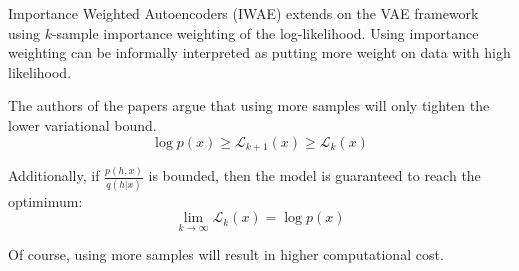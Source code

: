

Importance Weighted Autoencoders (IWAE) extends on the VAE framework using $k$-sample importance weighting of the log-likelihood.
Using importance weighting can be informally interpreted as putting more weight on data with high likelihood.

The authors of the papers argue that using more samples will only tighten the lower variational bound.
$$
\log p(x) \geq \mathcal{L}_{k+1}(x) \geq \mathcal{L}_{k}(x)
$$

Additionally, if $\frac{p(h,x)}{q(h|x)}$ is bounded, then the model is guaranteed to reach the optimimum:
$$
\lim_{k \rightarrow \infty} \mathcal{L}_{k}(x) = \log p(x)
$$

Of course, using more samples will result in higher computational cost.

